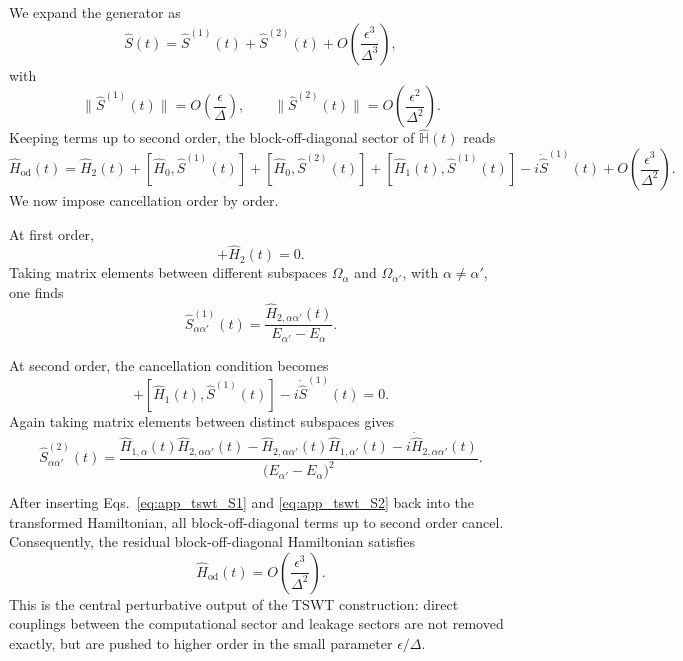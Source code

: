 We expand the generator as
\begin{equation}
\hat{S}(t)=\hat{S}^{(1)}(t)+\hat{S}^{(2)}(t)+O\!\left(\frac{\epsilon^3}{\Delta^3}\right),
\label{eq:app_tswt_generator_expansion}
\end{equation}
with
\begin{equation}
\|\hat{S}^{(1)}(t)\|=O\!\left(\frac{\epsilon}{\Delta}\right),
\qquad
\|\hat{S}^{(2)}(t)\|=O\!\left(\frac{\epsilon^2}{\Delta^2}\right).
\label{eq:app_tswt_generator_orders}
\end{equation}
Keeping terms up to second order, the block-off-diagonal sector of \(\hat{\mathbb{H}}(t)\) reads
\begin{equation}
\hat{H}_{\mathrm{od}}(t)
=
\hat{H}_2(t)
+
[\hat{H}_0,\hat{S}^{(1)}(t)]
+
[\hat{H}_0,\hat{S}^{(2)}(t)]
+
[\hat{H}_1(t),\hat{S}^{(1)}(t)]
-
i\dot{\hat{S}}^{(1)}(t)
+
O\!\left(\frac{\epsilon^3}{\Delta^2}\right).
\label{eq:app_tswt_offdiag_to_second_order}
\end{equation}
We now impose cancellation order by order.

At first order,
\begin{equation}
[\hat{H}_0,\hat{S}^{(1)}(t)]
+
\hat{H}_2(t)
=
0.
\label{eq:app_tswt_first_order_condition}
\end{equation}
Taking matrix elements between different subspaces \(\Omega_\alpha\) and \(\Omega_{\alpha'}\), with \(\alpha\neq\alpha'\), one finds
\begin{equation}
\hat{S}^{(1)}_{\alpha\alpha'}(t)
=
\frac{\hat{H}_{2,\alpha\alpha'}(t)}{E_{\alpha'}-E_{\alpha}}.
\label{eq:app_tswt_S1}
\end{equation}

At second order, the cancellation condition becomes
\begin{equation}
[\hat{H}_0,\hat{S}^{(2)}(t)]
+
[\hat{H}_1(t),\hat{S}^{(1)}(t)]
-
i\dot{\hat{S}}^{(1)}(t)
=
0.
\label{eq:app_tswt_second_order_condition}
\end{equation}
Again taking matrix elements between distinct subspaces gives
\begin{equation}
\hat{S}^{(2)}_{\alpha\alpha'}(t)
=
\frac{
\hat{H}_{1,\alpha}(t)\hat{H}_{2,\alpha\alpha'}(t)
-
\hat{H}_{2,\alpha\alpha'}(t)\hat{H}_{1,\alpha'}(t)
-
i\dot{\hat{H}}_{2,\alpha\alpha'}(t)
}{
\bigl(E_{\alpha'}-E_{\alpha}\bigr)^2
}.
\label{eq:app_tswt_S2}
\end{equation}

After inserting Eqs.~\eqref{eq:app_tswt_S1} and \eqref{eq:app_tswt_S2} back into the transformed Hamiltonian, all block-off-diagonal terms up to second order cancel. Consequently, the residual block-off-diagonal Hamiltonian satisfies
\begin{equation}
\hat{H}_{\mathrm{od}}(t)
=
O\!\left(\frac{\epsilon^3}{\Delta^2}\right).
\label{eq:app_tswt_residual_offdiag_scaling}
\end{equation}
This is the central perturbative output of the TSWT construction: direct couplings between the computational sector and leakage sectors are not removed exactly, but are pushed to higher order in the small parameter \(\epsilon/\Delta\).

